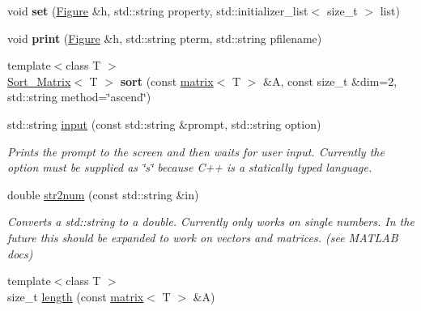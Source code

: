 \begin{DoxyCompactItemize}
\item 
\hypertarget{namespacekeycpp_ae67eb981ff22ef79a4ee90a9a40ae21f}{void {\bfseries set} (\hyperlink{classkeycpp_1_1_figure}{Figure} \&h, std\-::string property, std\-::initializer\-\_\-list$<$ size\-\_\-t $>$ list)}\label{namespacekeycpp_ae67eb981ff22ef79a4ee90a9a40ae21f}

\item 
\hypertarget{namespacekeycpp_af9dec3da4533a1db21a6c6c4fe8e740a}{void {\bfseries print} (\hyperlink{classkeycpp_1_1_figure}{Figure} \&h, std\-::string pterm, std\-::string pfilename)}\label{namespacekeycpp_af9dec3da4533a1db21a6c6c4fe8e740a}

\item 
\hypertarget{namespacekeycpp_abe567d1c5cdf91722dfbe5da89e859e8}{{\footnotesize template$<$class T $>$ }\\\hyperlink{structkeycpp_1_1_sort___matrix}{Sort\-\_\-\-Matrix}$<$ T $>$ {\bfseries sort} (const \hyperlink{classkeycpp_1_1matrix}{matrix}$<$ T $>$ \&A, const size\-\_\-t \&dim=2, std\-::string method=\char`\"{}ascend\char`\"{})}\label{namespacekeycpp_abe567d1c5cdf91722dfbe5da89e859e8}

\item 
\hypertarget{namespacekeycpp_aba69db64fe38ad271de1939d3f1a5520}{std\-::string \hyperlink{namespacekeycpp_aba69db64fe38ad271de1939d3f1a5520}{input} (const std\-::string \&prompt, std\-::string option)}\label{namespacekeycpp_aba69db64fe38ad271de1939d3f1a5520}

\begin{DoxyCompactList}\small\item\em Prints the prompt to the screen and then waits for user input. Currently the option must be supplied as \char`\"{}s\char`\"{} because C++ is a statically typed language. \end{DoxyCompactList}\item 
\hypertarget{namespacekeycpp_a4bca7924aad17a920f2f5f0606e6d9a9}{double \hyperlink{namespacekeycpp_a4bca7924aad17a920f2f5f0606e6d9a9}{str2num} (const std\-::string \&in)}\label{namespacekeycpp_a4bca7924aad17a920f2f5f0606e6d9a9}

\begin{DoxyCompactList}\small\item\em Converts a std\-::string to a double. Currently only works on single numbers. In the future this should be expanded to work on vectors and matrices. (see M\-A\-T\-L\-A\-B docs) \end{DoxyCompactList}\item 
\hypertarget{namespacekeycpp_a9c30ad952d4422425a171c12bdf33947}{{\footnotesize template$<$class T $>$ }\\size\-\_\-t \hyperlink{namespacekeycpp_a9c30ad952d4422425a171c12bdf33947}{length} (const \hyperlink{classkeycpp_1_1matrix}{matrix}$<$ T $>$ \&A)}\label{namespacekeycpp_a9c30ad952d4422425a171c12bdf33947}


\end{DoxyCompactItemize}
